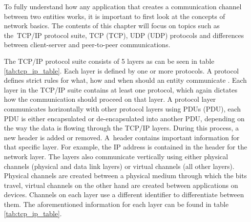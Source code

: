 To fully understand how any application that creates a communication channel between two entities works, it is important to first look at the concepts of network basics. The contents of this chapter will focus on topics such as the~TCP/IP protocol suite, TCP (\acl{TCP}), UDP (\acl{UDP}) protocols and differences between client-server and peer-to-peer communications.

The TCP/IP protocol suite consists of 5 layers as can be seen in table \ref{tab:tcp_ip_table}. Each layer is defined by one or more protocols. A protocol defines strict rules for what, how and when should an entity communicate \cite{Forouzan2010}. Each layer in the TCP/IP suite contains at least one protocol, which again dictates how the communication should proceed on that layer. A protocol layer communicates horizontally with other protocol layers using PDUs (\acl{PDU}), each PDU is either encapsulated or de-encapsulated into another PDU, depending on the way the data is flowing through the TCP/IP layers. During this process, a new header is added or removed. A~header contains important information for that specific layer. For example, the IP address is contained in the header for the network layer. The layers also communicate vertically using either physical channels (physical and data link layers) or virtual channels (all other layers). Physical channels are created between a physical medium through which the bits travel, virtual channels on the other hand are created between applications on devices. Channels on each layer use a different identifier to differentiate between them. The aforementioned information for each layer can be found in table \ref{tab:tcp_ip_table}.

